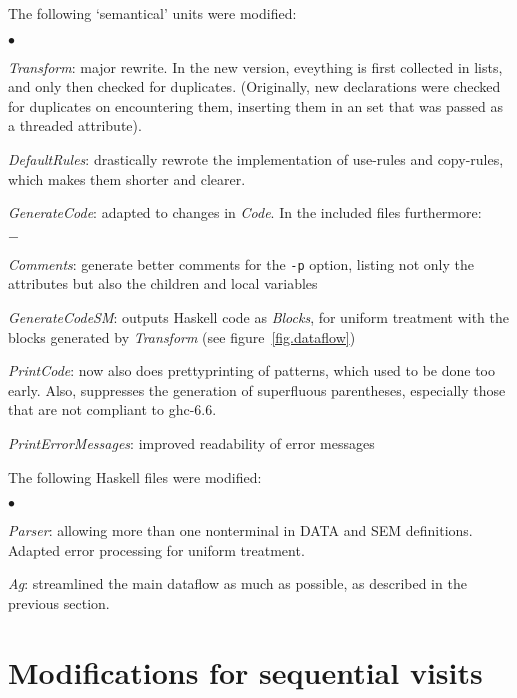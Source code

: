 \documentclass[twoside]{article}
\newenvironment{itize}{\begin{list}{$\bullet$}{\parsep=0pt\parskip=0pt\topsep=0pt\itemsep=0pt}}{\end{list}}
\newenvironment{subitize}{\begin{list}{$-$}{\parsep=0pt\parskip=0pt\topsep=0pt\itemsep=0pt}}{\end{list}}
\begin{document}
The following `semantical' units were modified:
\begin{itize}
\item {\em Transform}:
      major rewrite.
      In the new version, eveything is first collected in lists, and only then checked for duplicates.
      (Originally, new declarations were checked for duplicates on encountering them, inserting them
      in an set that was passed as a threaded attribute).
\item {\em DefaultRules}:
      drastically rewrote the implementation of use-rules and copy-rules,
      which makes them shorter and clearer.
\item {\em GenerateCode}:
      adapted to changes in {\em Code}.
      In the included files furthermore:
      \begin{subitize}
      \item {\em Comments}: 
            generate better comments for the \verb"-p" option,
            listing not only the attributes but also the children and local variables
      \item {\em GenerateCodeSM}:
            outputs Haskell code as {\em Blocks}, for uniform treatment with the blocks
            generated by {\em Transform} (see figure~\ref{fig.dataflow})
      \end{subitize}
\item {\em PrintCode}:
      now also does prettyprinting of patterns, which used to be done too early.
      Also, suppresses the generation of superfluous parentheses,
      especially those that are not compliant to ghc-6.6.
\item {\em PrintErrorMessages}:
      improved readability of error messages
\end{itize}



The following Haskell files were modified:
\begin{itize}
\item {\em Parser}:
      allowing more than one nonterminal in DATA and SEM definitions.
      Adapted error processing for uniform treatment.
\item {\em Ag}:
      streamlined the main dataflow as much as possible,
      as described in the previous section.
\end{itize}



\newpage
\section{Modifications for sequential visits}
\end{document}

